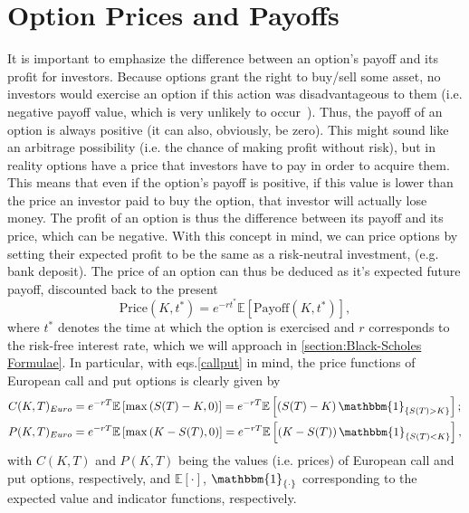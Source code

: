 \section{Option Prices and Payoffs}
It is important to emphasize the difference between an option's payoff and its profit for investors. Because options grant the right to buy/sell some asset, no investors would exercise an option if this action was disadvantageous to them (i.e. negative payoff value, which is very unlikely to occur~\citep{Wilmott}). Thus, the payoff of an option is always positive (it can also, obviously, be zero). This might sound like an arbitrage possibility (i.e. the chance of making profit without risk), but in reality options have a price that investors have to pay in order to acquire them. This means that even if the option's payoff is positive, if this value is lower than the price an investor paid to buy the option, that investor will actually lose money. The profit of an option is thus the difference between its payoff and its price, which can be negative.
With this concept in mind, we can price options by setting their expected profit to be the same as a risk-neutral investment, (e.g. bank deposit). The price of an option can thus be deduced as it's expected future payoff, discounted back to the present
\begin{equation}\label{pricepayoff}
\text{Price}(K,t^*)=e^{-rt^*}\mathbb{E}\left[\text{Payoff}(K,t^*)\right],
\end{equation}
\noindent where $t^*$ denotes the time at which the option is exercised and $r$ corresponds to the risk-free interest rate, which we will approach in \autoref{section:Black-Scholes Formulae}.
In particular, with eqs.\eqref{callput} in mind, the price functions of European call and put options is clearly given by
\begin{equation}\label{callprice}
\begin{split}
&C(K,T)_{Euro}=e^{-rT}\mathbb{E}\left[\max\left(S(T)-K,0\right)\right]=e^{-rT}\mathbb{E}\left[\left(S(T)-K\right)\mathbbm{1}_{\left\{S(T)>K\right\}}\right];\\
&P(K,T)_{Euro}=e^{-rT}\mathbb{E}\left[\max\left(K-S(T),0\right)\right]=e^{-rT}\mathbb{E}\left[\left(K-S(T)\right)\mathbbm{1}_{\left\{S(T)<K\right\}}\right],
\end{split}
\end{equation}
\noindent with $C(K,T)$ and $P(K,T)$ being the values (i.e. prices) of European call and put options, respectively, and $\mathbb{E}[\cdot]$, $\mathbbm{1}_{\{\cdot\}}$ corresponding to the expected value and indicator functions, respectively.


